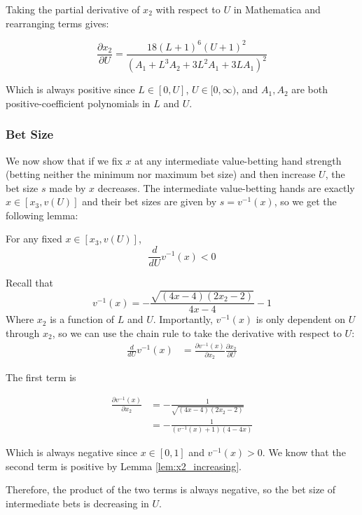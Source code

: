 \documentclass[../../main/main.tex]{subfiles}
\begin{document}
\begin{customproof}
    Taking the partial derivative of $x_2$ with respect to $U$ in Mathematica and rearranging terms gives:
    
    $$\frac{\partial x_2}{\partial U} = \frac{18 (L+1)^6 (U+1)^2}{\left(A_1 + L^3 A_2 + 3 L^2 A_1 + 3 L A_1 \right)^2}$$

    Which is always positive since $L \in [0, U]$, $U \in [0, \infty)$, and $A_1, A_2$ are both positive-coefficient polynomials in $L$ and $U$.   
\end{customproof}

\subsubsection{Bet Size}

We now show that if we fix $x$ at any intermediate value-betting hand strength (betting neither the minimum nor maximum bet size) and then increase $U$, the bet size $s$ made by $x$ decreases. The intermediate value-betting hands are exactly $x \in [x_3, v(U)]$ and their bet sizes are given by $s = v^{-1}(x)$, so we get the following lemma:

\begin{lemma}
    \label{lem:v_inverse_decreasing}
    For any fixed $x \in [x_3, v(U)]$, 
    \[ 
        \frac{d}{dU} v^{-1}(x) < 0
    \]
\end{lemma}

\begin{customproof}
    Recall that 
    $$v^{-1}(x) = -\frac{\sqrt{(4 x-4) (2 x_2-2)}}{4 x-4}-1$$
    Where $x_2$ is a function of $L$ and $U$. Importantly, $v^{-1}(x)$ is only dependent on $U$ through $x_2$, so we can use the chain rule to take the derivative with respect to $U$:
    \begin{align*}
        \frac{d}{dU} v^{-1}(x) & = \frac{\partial v^{-1}(x)}{\partial x_2} \frac{\partial x_2}{\partial U}
    \end{align*}

    The first term is 

\begin{align*}
    \frac{\partial v^{-1}(x)}{\partial x_2} & = - \frac{1}{\sqrt{(4 x-4) (2 x_2-2)}} \\
    &= - \frac{1}{(v^{-1}(x)+1)(4-4x)}
\end{align*}

    Which is always negative since $x \in [0, 1]$ and $v^{-1}(x) >0 $. We know that the second term is positive by Lemma \ref{lem:x2_increasing}.

    Therefore, the product of the two terms is always negative, so the bet size of intermediate bets is decreasing in $U$.
\end{customproof}
\end{document}
